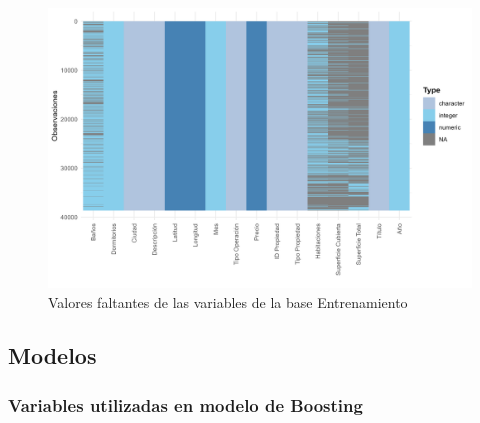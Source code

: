 \documentclass[a4paper]{article}
\theoremstyle{remark}
\theoremstyle{definition}
\begin{document}
\begin{figure}[H]
    \centering
    \caption{Valores faltantes de las variables de la base Entrenamiento }
    \includegraphics[width=0.75\linewidth]{Graficas/graf_miss_f2_train.png}
\end{figure}


\subsection{Modelos}

\subsubsection{Variables utilizadas en modelo de Boosting}
\end{document}
